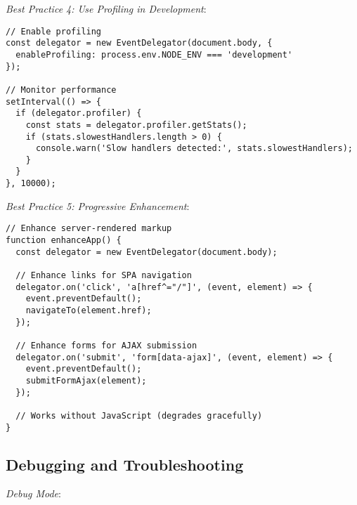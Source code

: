 \documentclass[11pt]{article}
\begin{document}
\emph{Best Practice 4: Use Profiling in Development}:

\begin{verbatim}
// Enable profiling
const delegator = new EventDelegator(document.body, {
  enableProfiling: process.env.NODE_ENV === 'development'
});

// Monitor performance
setInterval(() => {
  if (delegator.profiler) {
    const stats = delegator.profiler.getStats();
    if (stats.slowestHandlers.length > 0) {
      console.warn('Slow handlers detected:', stats.slowestHandlers);
    }
  }
}, 10000);
\end{verbatim}

\emph{Best Practice 5: Progressive Enhancement}:

\begin{verbatim}
// Enhance server-rendered markup
function enhanceApp() {
  const delegator = new EventDelegator(document.body);
  
  // Enhance links for SPA navigation
  delegator.on('click', 'a[href^="/"]', (event, element) => {
    event.preventDefault();
    navigateTo(element.href);
  });
  
  // Enhance forms for AJAX submission
  delegator.on('submit', 'form[data-ajax]', (event, element) => {
    event.preventDefault();
    submitFormAjax(element);
  });
  
  // Works without JavaScript (degrades gracefully)
}
\end{verbatim}
\subsection{Debugging and Troubleshooting}
\label{sec:orge56a65c}

\emph{Debug Mode}:
\end{document}
